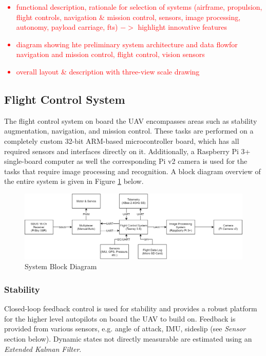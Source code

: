 \textcolor{red}{
\begin{itemize}
	\item
	      functional description, rationale for selection of systems (airframe, propulsion, flight controls, navigation \& mission control, sensors, image processing, autonomy, payload carriage, fts) $->$ highlight innovative features
	\item
	      diagram showing hte preliminary system architecture and data flowfor navigation and mission control, flight control, vision sensors
	\item
		overall layout \& description with three-view scale drawing
\end{itemize}
}

\subsection{Flight Control System}
The flight control system on board the UAV encompasses areas such as stability augmentation, navigation, and mission control. These tasks are performed on a completely custom 32-bit ARM-based microcontroller board, which has all required sensors and interfaces directly on it. Additionally, a Raspberry Pi 3+ single-board computer as well the corresponding Pi v2 camera is used for the tasks that require image processing and recognition. A block diagram overview of the entire system is given in Figure \ref{fig:SysBlockDiag} below.

\begin{figure}[H]
\centering
\includegraphics[scale=0.3]{figs/SysBlockDiagram.png}
\caption{System Block Diagram}
\label{fig:SysBlockDiag}
\end{figure}

\subsubsection{Stability}
Closed-loop feedback control is used for stability and provides a robust platform for the higher level autopilots on board the UAV to build on. Feedback is provided from various sensors, e.g. angle of attack, IMU, sideslip (see \textit{Sensor} section below). Dynamic states not directly measurable are estimated using an \textit{Extended Kalman Filter}. \\

